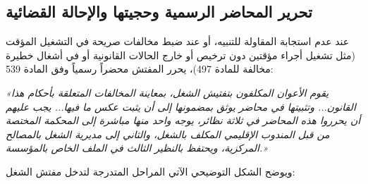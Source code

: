 \subsection{تحرير المحاضر الرسمية وحجيتها والإحالة القضائية}
عند عدم استجابة المقاولة للتنبيه، أو عند ضبط مخالفات صريحة في التشغيل المؤقت (مثل تشغيل أجراء مؤقتين دون ترخيص أو خارج الحالات القانونية أو في أشغال خطيرة مخالفة للمادة \textenglish{497})، يحرر المفتش محضراً رسمياً وفق المادة \textenglish{539}:

\begin{tcolorbox}[colback=lightgray!30, colframe=maincolor, arc=3pt, title={\textbf{نص المادة \textenglish{539} من القانون رقم \textenglish{65.99} (حجية المحاضر ومسار إحالتها)}}]
\textit{«يقوم الأعوان المكلفون بتفتيش الشغل، بمعاينة المخالفات المتعلقة بأحكام هذا القانون... وتثبيتها في محاضر يوثق بمضمونها إلى أن يثبت عكس ما فيها...
يجب عليهم أن يحرروا هذه المحاضر في ثلاثة نظائر، يوجه واحد منها مباشرة إلى المحكمة المختصة من قبل المندوب الإقليمي المكلف بالشغل، والثاني إلى مديرية الشغل بالمصالح المركزية، ويحتفظ بالنظير الثالث في الملف الخاص بالمؤسسة.»}
\end{tcolorbox}

ويوضح الشكل التوضيحي الآتي المراحل المتدرجة لتدخل مفتش الشغل:

